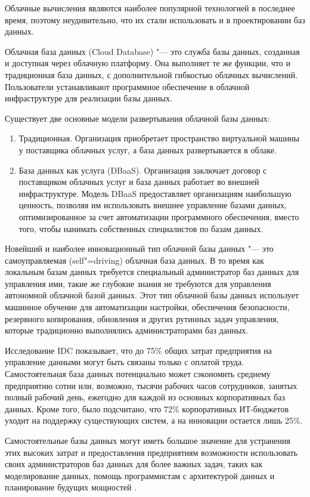 Облачные вычисления являются наиболее популярной технологией в последнее время, поэтому неудивительно, что их стали
использовать и в проектировании баз данных. 

Облачная база данных (Cloud Database) "--- это служба базы данных, созданная и доступная через облачную платформу. Она выполняет те же функции, что и традиционная база данных, с дополнительной гибкостью облачных вычислений. Пользователи устанавливают программное обеспечение в облачной инфраструктуре для реализации базы данных.

Существует две основные модели развертывания облачной базы данных:
\begin{enumerate}
    \item Традиционная. Организация приобретает пространство виртуальной машины у поставщика облачных услуг, а база данных развертывается в облаке. 
    \item База данных как услуга (DBaaS). Организация заключает договор с поставщиком облачных услуг и база данных работает во внешней инфраструктуре. Модель DBaaS предоставляет организациям наибольшую ценность, позволяя им использовать внешнее управление базами данных, оптимизированное за счет автоматизации программного обеспечения, вместо того, чтобы нанимать собственных специалистов по базам данных.
\end{enumerate}

Новейший и наиболее инновационный тип облачной базы данных "--- это самоуправляемая (self"=driving) облачная база данных. В то время как локальным базам данных требуется специальный администратор баз данных для управления ими, такие же глубокие знания не требуются для управления автономной облачной базой данных. Этот тип облачной базы данных использует машинное обучение для автоматизации настройки, обеспечения безопасности, резервного копирования, обновления и других рутинных задач управления, которые традиционно выполнялись администраторами баз данных.

Исследование IDC показывает, что до 75\% общих затрат предприятия на управление данными могут быть связаны только с оплатой труда. Самостоятельная база данных потенциально может сэкономить среднему предприятию сотни или, возможно, тысячи рабочих часов сотрудников, занятых полный рабочий день, ежегодно для каждой из основных корпоративных баз данных. Кроме того, было подсчитано, что 72\% корпоративных ИТ-бюджетов уходит на поддержку существующих систем, а на инновации остается лишь 25\%.

Самостоятельные базы данных могут иметь большое значение для устранения этих высоких затрат и предоставления предприятиям возможности использовать своих администраторов баз данных для более важных задач, таких как моделирование данных, помощь программистам с архитектурой данных и планирование будущих мощностей \cite{8}.